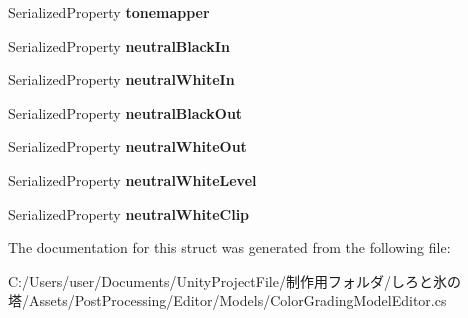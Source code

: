 \begin{DoxyCompactItemize}
\item 
\mbox{\label{struct_unity_editor_1_1_post_processing_1_1_color_grading_model_editor_1_1_tonemapping_settings_a5a26965d22bbdd114ea2e520b3e08ca9}} 
Serialized\+Property {\bfseries tonemapper}
\item 
\mbox{\label{struct_unity_editor_1_1_post_processing_1_1_color_grading_model_editor_1_1_tonemapping_settings_a2e9fcca65ed615611f2b4ba562bede8c}} 
Serialized\+Property {\bfseries neutral\+Black\+In}
\item 
\mbox{\label{struct_unity_editor_1_1_post_processing_1_1_color_grading_model_editor_1_1_tonemapping_settings_a1a3dc00cf90e457edd9eb44041dbad11}} 
Serialized\+Property {\bfseries neutral\+White\+In}
\item 
\mbox{\label{struct_unity_editor_1_1_post_processing_1_1_color_grading_model_editor_1_1_tonemapping_settings_a67b59e1bf33383c450ac1750998f6ad5}} 
Serialized\+Property {\bfseries neutral\+Black\+Out}
\item 
\mbox{\label{struct_unity_editor_1_1_post_processing_1_1_color_grading_model_editor_1_1_tonemapping_settings_aa20df34f89675d347813bfe0d0c7db19}} 
Serialized\+Property {\bfseries neutral\+White\+Out}
\item 
\mbox{\label{struct_unity_editor_1_1_post_processing_1_1_color_grading_model_editor_1_1_tonemapping_settings_a00322f6043571b427d887f25f5cc8bd9}} 
Serialized\+Property {\bfseries neutral\+White\+Level}
\item 
\mbox{\label{struct_unity_editor_1_1_post_processing_1_1_color_grading_model_editor_1_1_tonemapping_settings_ab2281c10cc0ab68d78ba1146db7484f8}} 
Serialized\+Property {\bfseries neutral\+White\+Clip}
\end{DoxyCompactItemize}


The documentation for this struct was generated from the following file\+:\begin{DoxyCompactItemize}
\item 
C\+:/\+Users/user/\+Documents/\+Unity\+Project\+File/制作用フォルダ/しろと氷の塔/\+Assets/\+Post\+Processing/\+Editor/\+Models/Color\+Grading\+Model\+Editor.\+cs\end{DoxyCompactItemize}
